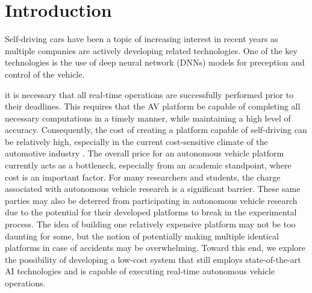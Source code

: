 \section{Introduction} \label{sec:intro}

%
% 
Self-driving cars have been a topic of increasing interest in recent
years as multiple companies are actively developing related
technologies. One of the key technologies is the use of deep neural
network (DNNs) models for preception and control of the vehicle.

%
it is necessary that all real-time operations are successfully
performed prior to their deadlines. This requires that the AV platform
be capable of completing all necessary computations in a timely
manner, while maintaining a high level of accuracy. Consequently, the
cost of creating a platform capable of self-driving can be relatively
high, especially in the current cost-sensitive climate of the
automotive industry \cite{}. The overall price for an autonomous
vehicle platform currently acts as a bottleneck, especially from an
academic standpoint, where cost is an important factor. For many
researchers and students, the charge associated with autonomous
vehicle research is a significant barrier. These same parties may also
be deterred from participating in autonomous vehicle research due to
the potential for their developed platforms to break in the
experimental process. The idea of building one relatively expensive
platform may not be too daunting for some, but the notion of
potentially making multiple identical platforms in case of accidents
may be overwhelming. Toward this end, we explore the possibility of
developing a low-cost system that still employs state-of-the-art AI
technologies and is capable of executing real-time autonomous vehicle
operations. 

